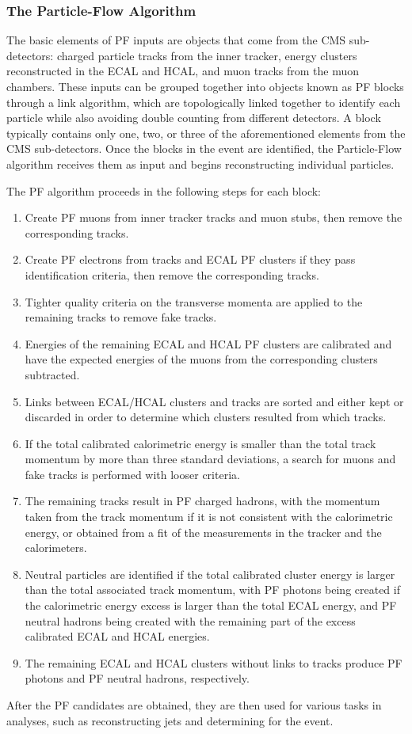 \subsubsection{The Particle-Flow Algorithm}

The basic elements of PF inputs are objects that come from the CMS sub-detectors: charged particle tracks from the inner tracker, energy clusters reconstructed in the ECAL and HCAL, and muon tracks from the muon chambers.
These inputs can be grouped together into objects known as PF blocks through a link algorithm, which are topologically linked together to identify each particle while also avoiding double counting from different detectors.
A block typically contains only one, two, or three of the aforementioned elements from the CMS sub-detectors.
Once the blocks in the event are identified, the Particle-Flow algorithm receives them as input and begins reconstructing individual particles.

The PF algorithm proceeds in the following steps for each block:
\begin{enumerate}
  \item Create PF muons from inner tracker tracks and muon stubs, then remove the corresponding tracks.
  \item Create PF electrons from tracks and ECAL PF clusters if they pass identification criteria, then remove the corresponding tracks.
  \item Tighter quality criteria on the transverse momenta are applied to the remaining tracks to remove fake tracks.
  \item Energies of the remaining ECAL and HCAL PF clusters are calibrated and have the expected energies of the muons from the corresponding clusters subtracted.
  \item Links between ECAL/HCAL clusters and tracks are sorted and either kept or discarded in order to determine which clusters resulted from which tracks.
  \item If the total calibrated calorimetric energy is smaller than the total track momentum by more than three standard deviations, a search for muons and fake tracks is performed with looser criteria.
  \item The remaining tracks result in PF charged hadrons, with the momentum taken from the track momentum if it is not consistent with the calorimetric energy, or obtained from a fit of the measurements in the tracker and the calorimeters.
  \item Neutral particles are identified if the total calibrated cluster energy is larger than the total associated track momentum, with PF photons being created if the calorimetric energy excess is larger than the total ECAL energy, and PF neutral hadrons being created with the remaining part of the excess calibrated ECAL and HCAL energies.
  \item The remaining ECAL and HCAL clusters without links to tracks produce PF photons and PF neutral hadrons, respectively.
\end{enumerate}
After the PF candidates are obtained, they are then used for various tasks in analyses, such as reconstructing jets and determining \ptmiss for the event.

